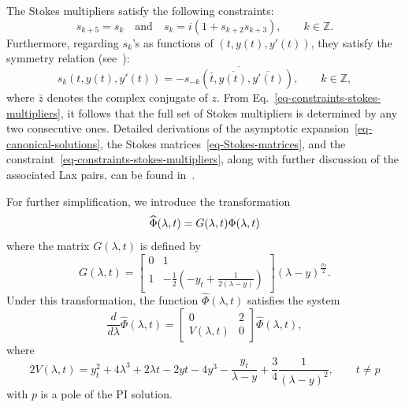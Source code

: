\documentclass[12pt]{article}
\theoremstyle{plain}
\theoremstyle{definition}
\numberwithin{equation}{section}
\begin{document}
The Stokes multipliers satisfy the following constraints:
\begin{equation}\label{eq-constraints-stokes-multipliers}
s_{k+5}=s_{k}\quad \text{and}\quad s_{k}=i(1+s_{k+2}s_{k+3}),
\qquad k\in\mathbb{Z}.
\end{equation}
Furthermore, regarding $s_{k}$'s as functions of $(t,y(t),y'(t))$, they satisfy the symmetry relation (see~\cite[Eq.~(13)]{AAKapaev-1988}):
\begin{equation}\label{eq-sk-s-k-relation}
s_{k}\left (t,y(t),y'(t)\right)=-\overline{s_{-k}\left (\bar{t},\overline{y(t)},\overline{y'(t)}\right )}, \qquad k\in\mathbb{Z},
\end{equation}
where $\bar{z}$ denotes the complex conjugate of $z$.
From Eq.~\eqref{eq-constraints-stokes-multipliers}, it follows that the full set of Stokes multipliers is determined by any two consecutive ones. Detailed derivations of the asymptotic expansion~\eqref{eq-canonical-solutions}, the Stokes matrices~\eqref{eq-Stokes-matrices}, and the constraint~\eqref{eq-constraints-stokes-multipliers}, along with further discussion of the associated Lax pairs, can be found in~\cite{FAS-2006}.

For further simplification, we introduce the transformation
\begin{equation}\label{eq-def-hat{Phi}}
\widehat{\Phi}(\lambda,t)=G(\lambda,t)\Phi(\lambda,t)
\end{equation}
where the matrix \( G(\lambda, t) \) is defined by
\begin{equation}\label{def-G(lambda,t)}
G(\lambda,t)
=\begin{bmatrix}0&1\\ 1&-\frac{1}{2}\left(-y_{t}+\frac{1}{2(\lambda-y)}\right)\end{bmatrix}
(\lambda-y)^{\frac{\sigma_{3}}{2}}.
\end{equation}
Under this transformation, the function \( \widehat{\Phi}(\lambda, t) \) satisfies the system
\begin{equation}\label{eq-system-hat-Phi}
\frac{d}{d\lambda}\widehat{\Phi}(\lambda,t)
=\begin{bmatrix}0&2\\V(\lambda,t)&0\end{bmatrix}\widehat{\Phi}(\lambda,t),
\end{equation}
where
\[
2V(\lambda,t)=y_{t}^{2}+4\lambda^{3}+2\lambda t-2y t-4y^{3}-\frac{y_{t}}{\lambda-y}+\frac{3}{4}\frac{1}{(\lambda-y)^2}, \qquad t\neq p
\]
with \( p \) is a pole of the PI solution.
\end{document}
